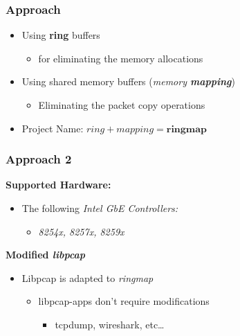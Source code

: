 \begin{frame}
\frametitle{Approach}
\begin{itemize}
	\item<1-> Using \textbf{ring} buffers
		\begin{itemize}
			\item<1-> for eliminating the memory allocations
		\end{itemize}

	\item<2-> Using shared memory buffers (\emph{memory \textbf{mapping}})
		\begin{itemize}
			\item<2-> Eliminating the packet copy operations				
		\end{itemize}
	\item<3->[$\Rightarrow$] Project Name: $ring + mapping = \textbf{ringmap}$
\end{itemize}
\end{frame}


\begin{frame}
\frametitle{Approach 2}
\textbf{Supported Hardware:}
\begin{itemize}
	\item The following \emph{Intel GbE Controllers:}
		\begin{itemize}
			\item \small{\emph{8254x, 8257x, 8259x}}\newline
		\end{itemize}
\end{itemize}

\textbf{Modified \emph{libpcap}}
\begin{itemize}
	\item Libpcap is adapted to \emph{ringmap}
	\begin{itemize}
		\item libpcap-apps don't require modifications
			\begin{itemize}
				\item tcpdump, wireshark, etc\ldots
			\end{itemize}
	\end{itemize}
\end{itemize}
\end{frame}


